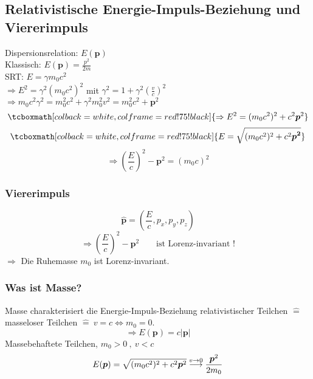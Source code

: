 \documentclass[titlepage,11pt,a4paper,ngerman]{report}
\newcommand{\tx}[1]{\textrm{#1}}
\renewcommand{\vec}[1]{\boldsymbol{#1}}
\newcommand{\rmbox}[1]{\tcboxmath[colback=white,colframe=red!75!black]{#1}}
\begin{document}
\subsection{Relativistische Energie-Impuls-Beziehung und Viererimpuls}
Dispersionsrelation: $ E(\vec{p}) $\\
Klassisch: $ E(\vec{p}) = \frac{p^2}{2m} $\\
SRT: $ E = \gamma m_0 c^2 $\\
$ \Rightarrow E^2 = \gamma ^2 (m_0 c^2)^2 $ mit $ \gamma ^2 = 1 + \gamma^2 \left(\frac{v}{c}\right)^2 $\\
$ \Rightarrow m_0 c^2 \gamma ^2 = m_0^2 c^2 + \gamma^2 m_0^2 v^2 = m_0^2 c^2 + \vec{p}^2 $
\begin{equation*}
\rmbox{\Rightarrow E^2 = (m_0 c^2)^2 + c^2 \vec{p}^2}
\end{equation*}
\begin{equation*}
\rmbox{E = \sqrt{(m_0 c^2)^2 + c^2 \vec{p^2}}}
\end{equation*}
\begin{equation*}
\Rightarrow \left(\frac{E}{c}\right)^2 - \vec{p}^2 = (m_0 c)^2
\end{equation*}

\subsubsection{Viererimpuls}
\begin{equation*}
\hat{\vec{p}} = \left(\frac{E}{c} , p_x, p_y, p_z\right)
\end{equation*}
\begin{equation*}
\Rightarrow \left(\frac{E}{c}\right)^2 - \vec{p}^2 \qquad \tx{ist Lorenz-invariant !}
\end{equation*}
$ \Rightarrow $ Die Ruhemasse $ m_0 $ ist Lorenz-invariant.

\subsubsection{Was ist Masse?}
Masse charakterisiert die Energie-Impuls-Beziehung relativistischer Teilchen $ \widehat{=} $ masseloser Teilchen $ \widehat{=}\ v = c \Leftrightarrow m_0 = 0 $.
\begin{equation*}
\Rightarrow E(\vec{p}) = c |\vec{p}|
\end{equation*}
Massebehaftete Teilchen, $ m_0 > 0 \ , \ v < c$
\begin{equation*}
E(\vec{p}) = \sqrt{(m_0 c^2)^2 + c^2 \vec{p}^2} \buildrel v \to 0 \over \longrightarrow \frac{\vec{p}^2}{2 m_0}
\end{equation*}
\end{document}
